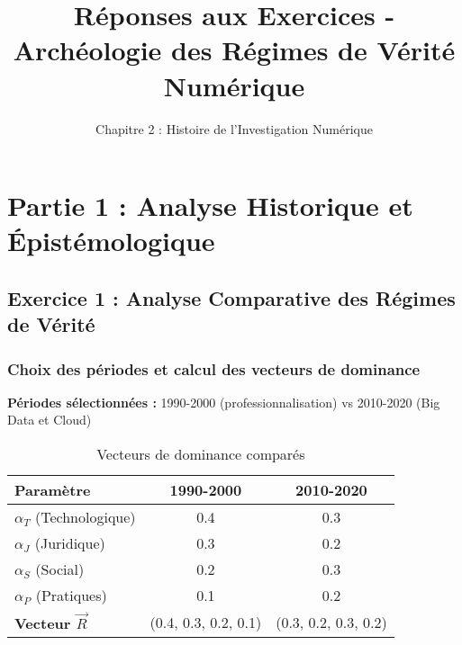 \documentclass[12pt,a4paper]{article}
\begin{document}

\geometry{}

\title{Réponses aux Exercices - Archéologie des Régimes de Vérité Numérique}
\author{Chapitre 2 : Histoire de l'Investigation Numérique}
\date{}



\maketitle



\section{Partie 1 : Analyse Historique et Épistémologique}

\subsection{Exercice 1 : Analyse Comparative des Régimes de Vérité}

\subsubsection{Choix des périodes et calcul des vecteurs de dominance}

\textbf{Périodes sélectionnées :} 1990-2000 (professionnalisation) vs 2010-2020 (Big Data et Cloud)

\begin{table}[H]
\centering
\begin{tabular}{|l|c|c|}
\hline
\textbf{Paramètre} & \textbf{1990-2000} & \textbf{2010-2020} \\
\hline
$\alpha_T$ (Technologique) & 0.4 & 0.3 \\
\hline
$\alpha_J$ (Juridique) & 0.3 & 0.2 \\
\hline
$\alpha_S$ (Social) & 0.2 & 0.3 \\
\hline
$\alpha_P$ (Pratiques) & 0.1 & 0.2 \\
\hline
\textbf{Vecteur $\vec{R}$} & (0.4, 0.3, 0.2, 0.1) & (0.3, 0.2, 0.3, 0.2) \\
\hline
\end{tabular}
\caption{Vecteurs de dominance comparés}
\end{table}
\end{document}
